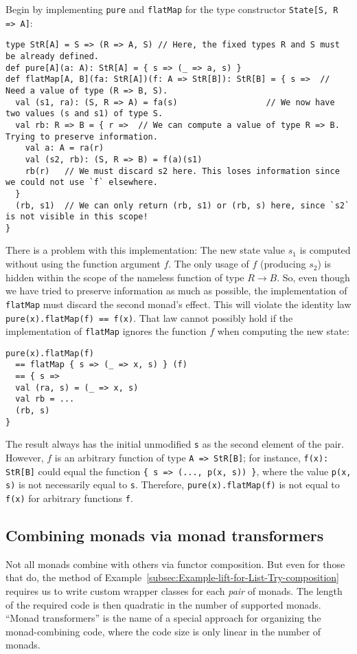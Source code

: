Begin by implementing \lstinline!pure! and \lstinline!flatMap! for
the type constructor \lstinline!State[S, R => A]!:
\begin{lstlisting}
type StR[A] = S => (R => A, S) // Here, the fixed types R and S must be already defined.
def pure[A](a: A): StR[A] = { s => (_ => a, s) }
def flatMap[A, B](fa: StR[A])(f: A => StR[B]): StR[B] = { s =>  // Need a value of type (R => B, S).
  val (s1, ra): (S, R => A) = fa(s)                  // We now have two values (s and s1) of type S.
  val rb: R => B = { r =>  // We can compute a value of type R => B. Trying to preserve information.
    val a: A = ra(r)
    val (s2, rb): (S, R => B) = f(a)(s1)
    rb(r)   // We must discard s2 here. This loses information since we could not use `f` elsewhere.
  }
  (rb, s1)  // We can only return (rb, s1) or (rb, s) here, since `s2` is not visible in this scope!
}
\end{lstlisting}
There is a problem with this implementation: The new state value $s_{1}$
is computed without using the function argument $f$. The only usage
of $f$ (producing $s_{2}$) is hidden within the scope of the nameless
function of type $R\rightarrow B$. So, even though we have tried
to preserve information as much as possible, the implementation of
\lstinline!flatMap! must discard the second monad\textsf{'}s effect. This
will violate the identity law \lstinline!pure(x).flatMap(f) == f(x)!.
That law cannot possibly hold if the implementation of \lstinline!flatMap!
ignores the function $f$ when computing the new state:
\begin{lstlisting}
pure(x).flatMap(f)
  == flatMap { s => (_ => x, s) } (f)
  == { s =>
  val (ra, s) = (_ => x, s)
  val rb = ...
  (rb, s)
}
\end{lstlisting}
The result always has the initial unmodified \lstinline!s! as the
second element of the pair. However, $f$ is an arbitrary function
of type \lstinline!A => StR[B]!; for instance, \lstinline!f(x): StR[B]!
could equal the function \lstinline!{ s => (..., p(x, s)) }!, where
the value \lstinline!p(x, s)! is not necessarily equal to \lstinline!s!.
Therefore, \lstinline!pure(x).flatMap(f)! is not equal to \lstinline!f(x)!
for arbitrary functions \lstinline!f!.

\subsection{Combining monads via monad transformers}

Not all monads combine with others via functor composition. But even
for those that do, the method of Example~\ref{subsec:Example-lift-for-List-Try-composition}
requires us to write custom wrapper classes for each\emph{ pair} of
monads. The length of the required code is then quadratic in the number
of supported monads. \textsf{``}Monad transformers\textsf{''} is the name of a special
approach for organizing the monad-combining code, where the code size
is only linear in the number of monads.


